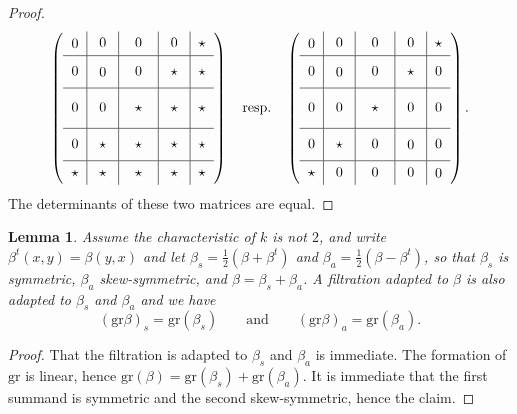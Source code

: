 \documentclass{article}
\def\tx#1{\textrm{#1}}
\newtheorem{lem}[thm]{Lemma}
\theoremstyle{definition}
\numberwithin{equation}{subsection}
\renewcommand{\-}{\hyp{}}
\newcommand{\diagblock}[2]{\vcenter{\hbox{\parbox[c][#1][c]{#1}{\centering $#2$}}}}
\begin{document}
\begin{appendices}
\begin{proof}
\[
\setlength{\arraycolsep}{0pt}
\left(
\begin{array}{c|c|c|c|c}
  \diagblock{6mm}{0} & 0 & 0 & 0 & \star \\ \hline
  0 & \diagblock{8mm}{0} & 0 & \star & \star \\ \hline
  0 & 0 &
  \diagblock{10mm}{\star}
  & \star & \star \\ \hline
  0 & \star & \star & \diagblock{8mm}{\star} & \star \\ \hline
  \star & \star & \star & \star & \diagblock{6mm}{\star}
\end{array}
\right)
\quad\tx{resp.}\quad
\left(
\begin{array}{c|c|c|c|c}
  \diagblock{6mm}{0} & 0 & 0 & 0 & \star \\ \hline
  0 & \diagblock{8mm}{0} & 0 & \star & 0 \\ \hline
  0 & 0 &
  \diagblock{10mm}{\star}
  & 0 & 0 \\ \hline
  0 & \star & 0 & \diagblock{8mm}{0} & 0 \\ \hline
  \star & 0 & 0 & 0 & \diagblock{6mm}{0}
\end{array}
\right).
\]
The determinants of these two matrices are equal.
\end{proof}

\begin{lem} \label{lem:grbetasym}
	Assume the characteristic of $k$ is not $2$, and write $\beta^t(x,y)=\beta(y,x)$ and let $\beta_s=\tfrac{1}{2}(\beta+\beta^t)$ and $\beta_a=\tfrac{1}{2}(\beta-\beta^t)$, so that $\beta_s$ is symmetric, $\beta_a$ skew-symmetric, and $\beta=\beta_s+\beta_a$. A filtration adapted to $\beta$ is also adapted to $\beta_s$ and $\beta_a$ and we have
	\[ (\mathrm{gr}\beta)_s=\mathrm{gr}(\beta_s)\qquad\text{and}\qquad (\mathrm{gr}\beta)_a = \mathrm{gr}(\beta_a). \]
\end{lem}
\begin{proof}
	That the filtration is adapted to $\beta_s$ and $\beta_a$ is immediate. The formation of $\tx{gr}$ is linear, hence $\tx{gr}(\beta)=\tx{gr}(\beta_s)+\tx{gr}(\beta_a)$. It is immediate that the first summand is symmetric and the second skew-symmetric, hence the claim.
\end{proof}


\end{appendices}
\end{document}
